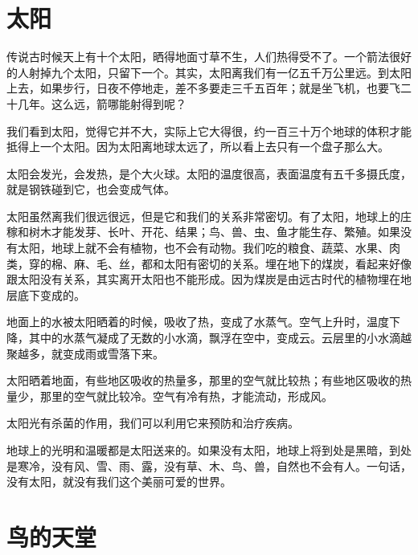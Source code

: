 \documentclass[12pt,UTF-8,openany]{ctexbook}
\begin{document}
\chapter{太阳}

\begin{large}
    
    传说古时候天上有十个太阳，晒得地面寸草不生，人们热得受不了。一个箭法很好的人射掉九个太阳，只留下一个。其实，太阳离我们有一亿五千万公里远。到太阳上去，如果步行，日夜不停地走，差不多要走三千五百年；就是坐飞机，也要飞二十几年。这么远，箭哪能射得到呢？
    
    我们看到太阳，觉得它并不大，实际上它大得很，约一百三十万个地球的体积才能抵得上一个太阳。因为太阳离地球太远了，所以看上去只有一个盘子那么大。
    
    太阳会发光，会发热，是个大火球。太阳的温度很高，表面温度有五千多摄氏度，就是钢铁碰到它，也会变成气体。
    
    太阳虽然离我们很远很远，但是它和我们的关系非常密切。有了太阳，地球上的庄稼和树木才能发芽、长叶、开花、结果；鸟、兽、虫、鱼才能生存、繁殖。如果没有太阳，地球上就不会有植物，也不会有动物。我们吃的粮食、蔬菜、水果、肉类，穿的棉、麻、毛、丝，都和太阳有密切的关系。埋在地下的煤炭，看起来好像跟太阳没有关系，其实离开太阳也不能形成。因为煤炭是由远古时代的植物埋在地层底下变成的。
    
    地面上的水被太阳晒着的时候，吸收了热，变成了水蒸气。空气上升时，温度下降，其中的水蒸气凝成了无数的小水滴，飘浮在空中，变成云。云层里的小水滴越聚越多，就变成雨或雪落下来。
    
    太阳晒着地面，有些地区吸收的热量多，那里的空气就比较热；有些地区吸收的热量少，那里的空气就比较冷。空气有冷有热，才能流动，形成风。
    
    太阳光有杀菌的作用，我们可以利用它来预防和治疗疾病。
    
    地球上的光明和温暖都是太阳送来的。如果没有太阳，地球上将到处是黑暗，到处是寒冷，没有风、雪、雨、露，没有草、木、鸟、兽，自然也不会有人。一句话，没有太阳，就没有我们这个美丽可爱的世界。
    
\end{large}



\chapter{鸟的天堂}
\end{document}
